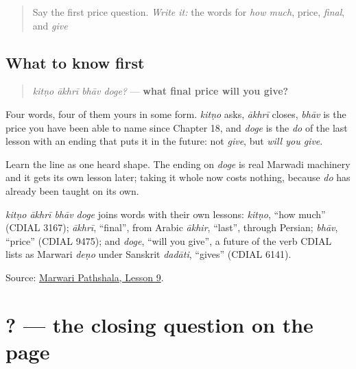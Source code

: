 \label{lesson:MW-C24-hear-final-price}



\begin{quote}
Say the first price question. \emph{Write it:} the words for \emph{how much}, price, \emph{final}, and \emph{give}
\end{quote}

\subsection*{What to know first}
\begin{quote}
\emph{kitṇo ākhrī bhāv doge?} — \textbf{what final price will you give?}
\end{quote}

Four words, four of them yours in some form. \emph{kitṇo} asks, \emph{ākhrī} closes, \emph{bhāv} is the price you have been able to name since Chapter 18, and \emph{doge} is the \emph{do} of the last lesson with an ending that puts it in the future: not \emph{give}, but \emph{will you give}.

Learn the line as one heard shape. The ending on \emph{doge} is real Marwadi machinery and it gets its own lesson later; taking it whole now costs nothing, because \emph{do} has already been taught on its own.

\begin{cousinweb}
\emph{kitṇo ākhrī bhāv doge} joins words with their own lessons: \emph{kitṇo}, \textquotedblleft{}how much\textquotedblright{} (CDIAL 3167); \emph{ākhrī}, \textquotedblleft{}final\textquotedblright{}, from Arabic \emph{ākhir}, \textquotedblleft{}last\textquotedblright{}, through Persian; \emph{bhāv}, \textquotedblleft{}price\textquotedblright{} (CDIAL 9475); and \emph{doge}, \textquotedblleft{}will you give\textquotedblright{}, a future of the verb CDIAL lists as Marwari \emph{deṇo} under Sanskrit \emph{dadāti}, \textquotedblleft{}gives\textquotedblright{} (CDIAL 6141).
\end{cousinweb}

\begin{tcolorbox}[breakable,colback=teal!4,colframe=teal!35!black,title={Before you move on}]
Source: \href{https://www.marwaripathshala.com/marwari-lesson-9-english}{Marwari Pathshala, Lesson 9}.
\end{tcolorbox}
\section[\texorpdfstring{\mw{कितणो} \mw{आखरी} \mw{भाव} … (kitṇo ākhrī bhāv …)}{कितणो आखरी भाव … (kitṇo ākhrī bhāv …)}]{   ? — the closing question on the page}

